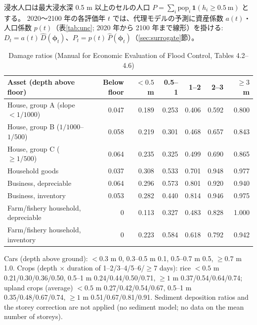 \documentclass[a4paper,10pt]{ltjsarticle}
\begin{document}
浸水人口は最大浸水深 0.5 m 以上のセルの人口 $P=\sum_i \mathrm{pop}_i\,\mathbf{1}(h_i\ge0.5\ \mathrm{m})$ とする。
2020〜2100 年の各評価年 $t$ では、代理モデルの予測に資産係数 $a(t)$・人口係数 $p(t)$（表\ref{tab:unc}; 2020 年から 2100 年まで線形）を掛ける:
$D_t=a(t)\,\hat D(\boldsymbol\phi_t)$、$P_t=p(t)\,\hat P(\boldsymbol\phi_t)$（\ref{sec:surrogate}節）。

\begin{table}[tbp]
\centering\footnotesize\setlength{\tabcolsep}{4pt}
\caption{Damage ratios (Manual for Economic Evaluation of Flood Control\cite{mlit_manual}, Tables 4.2--4.6)}
\label{tab:damrate}
\begin{tabular}{@{}lrrrrrr@{}}
\toprule
Asset (depth above floor) & Below floor & $<0.5$ m & 0.5--1 & 1--2 & 2--3 & $\ge3$ m \\
\midrule
House, group A (slope $<1/1000$) & 0.047 & 0.189 & 0.253 & 0.406 & 0.592 & 0.800 \\
House, group B ($1/1000$--$1/500$) & 0.058 & 0.219 & 0.301 & 0.468 & 0.657 & 0.843 \\
House, group C ($\ge1/500$) & 0.064 & 0.235 & 0.325 & 0.499 & 0.690 & 0.865 \\
Household goods & 0.037 & 0.308 & 0.533 & 0.701 & 0.948 & 0.977 \\
Business, depreciable & 0.064 & 0.296 & 0.573 & 0.801 & 0.920 & 0.940 \\
Business, inventory & 0.053 & 0.282 & 0.440 & 0.814 & 0.946 & 0.975 \\
Farm/fishery household, depreciable & 0 & 0.113 & 0.327 & 0.483 & 0.828 & 1.000 \\
Farm/fishery household, inventory & 0 & 0.223 & 0.584 & 0.618 & 0.792 & 0.942 \\
\bottomrule
\end{tabular}
\par\footnotesize\raggedright Cars (depth above ground): $<0.3$ m 0, 0.3--0.5 m 0.1, 0.5--0.7 m 0.5, $\ge0.7$ m 1.0.
Crops (depth × duration of 1--2/3--4/5--6/$\ge$7 days): rice $<0.5$ m 0.21/0.30/0.36/0.50, 0.5--1 m 0.24/0.44/0.50/0.71, $\ge1$ m 0.37/0.54/0.64/0.74;
upland crops (average) $<0.5$ m 0.27/0.42/0.54/0.67, 0.5--1 m 0.35/0.48/0.67/0.74, $\ge1$ m 0.51/0.67/0.81/0.91.
Sediment deposition ratios and the storey correction are not applied (no sediment model; no data on the mean number of storeys).
\end{table}
\end{document}
